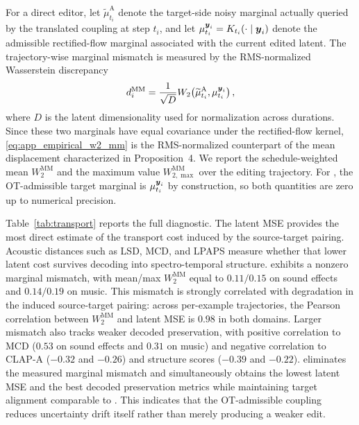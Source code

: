For a direct editor, let $\widetilde{\mu}^{\mathrm{A}}_{t_i}$ denote the target-side noisy marginal actually queried by the translated \method coupling at step $t_i$, and let $\mu^{\boldsymbol{y}_i}_{t_i}=K_{t_i}(\cdot\mid\boldsymbol{y}_i)$ denote the admissible rectified-flow marginal associated with the current edited latent.
The trajectory-wise marginal mismatch is measured by the RMS-normalized Wasserstein discrepancy
\begin{equation}
    \label{eq:app_empirical_w2_mm}
    d_i^{\mathrm{MM}}
    =
    \frac{1}{\sqrt{D}}
    W_2\!\left(
    \widetilde{\mu}^{\mathrm{A}}_{t_i},
    \mu^{\boldsymbol{y}_i}_{t_i}
    \right),
\end{equation}
where $D$ is the latent dimensionality used for normalization across durations.
Since these two marginals have equal covariance under the rectified-flow kernel, \eqref{eq:app_empirical_w2_mm} is the RMS-normalized counterpart of the mean displacement characterized in Proposition~4.
We report the schedule-weighted mean $W_2^{\mathrm{MM}}$ and the maximum value $W_{2,\max}^{\mathrm{MM}}$ over the editing trajectory.
For \methodplus, the OT-admissible target marginal is $\mu^{\boldsymbol{y}_i}_{t_i}$ by construction, so both quantities are zero up to numerical precision.

Table~\ref{tab:transport} reports the full diagnostic.
The latent MSE provides the most direct estimate of the transport cost induced by the source-target pairing.
Acoustic distances such as LSD, MCD, and LPAPS measure whether that lower latent cost survives decoding into spectro-temporal structure.
\method exhibits a nonzero marginal mismatch, with mean/max $W_2^{\mathrm{MM}}$ equal to $0.11/0.15$ on sound effects and $0.14/0.19$ on music.
This mismatch is strongly correlated with degradation in the induced source-target pairing: across per-example \method trajectories, the Pearson correlation between $W_2^{\mathrm{MM}}$ and latent MSE is $0.98$ in both domains.
Larger mismatch also tracks weaker decoded preservation, with positive correlation to MCD ($0.53$ on sound effects and $0.31$ on music) and negative correlation to CLAP-A ($-0.32$ and $-0.26$) and structure scores ($-0.39$ and $-0.22$).
\methodplus eliminates the measured marginal mismatch and simultaneously obtains the lowest latent MSE and the best decoded preservation metrics while maintaining target alignment comparable to \method.
This indicates that the OT-admissible coupling reduces uncertainty drift itself rather than merely producing a weaker edit.

